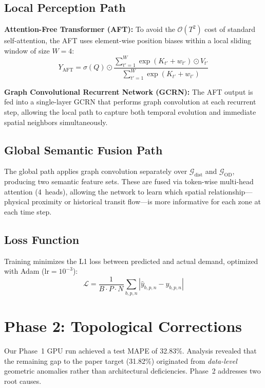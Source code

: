 \documentclass{rapportECL}
\begin{document}
\subsection{Local Perception Path}
\textbf{Attention-Free Transformer (AFT):} To avoid the $\mathcal{O}(T^2)$ cost of standard self-attention, the AFT uses element-wise position biases within a local sliding window of size $W{=}4$:
\begin{equation}
Y_{\text{AFT}} = \sigma(Q) \odot \frac{\sum_{t'=1}^{W} \exp(K_{t'} + w_{t'}) \odot V_{t'}}{\sum_{t'=1}^{W} \exp(K_{t'} + w_{t'})}
\end{equation}

\noindent\textbf{Graph Convolutional Recurrent Network (GCRN):} The AFT output is fed into a single-layer GCRN that performs graph convolution at each recurrent step, allowing the local path to capture both temporal evolution and immediate spatial neighbors simultaneously.

\subsection{Global Semantic Fusion Path}
The global path applies graph convolution separately over $\mathcal{G}_{\text{dist}}$ and $\mathcal{G}_{\text{OD}}$, producing two semantic feature sets. These are fused via token-wise multi-head attention (4~heads), allowing the network to learn which spatial relationship---physical proximity or historical transit flow---is more informative for each zone at each time step.

\subsection{Loss Function}
Training minimizes the L1 loss between predicted and actual demand, optimized with Adam ($\text{lr}=10^{-3}$):
\begin{equation}
\mathcal{L} = \frac{1}{B \cdot P \cdot N} \sum_{b,p,n} \left|\hat{y}_{b,p,n} - y_{b,p,n}\right|
\end{equation}

\section{Phase 2: Topological Corrections}

Our Phase~1 GPU run achieved a test MAPE of 32.83\%. Analysis revealed that the remaining gap to the paper target (31.82\%) originated from \emph{data-level} geometric anomalies rather than architectural deficiencies. Phase~2 addresses two root causes.
\end{document}
